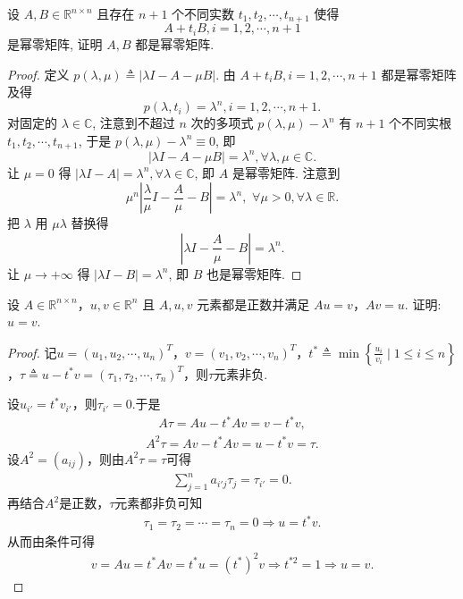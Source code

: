 \documentclass[../../main.tex]{subfiles}%
\begin{document}
\begin{example}
设 \( A,B \in \mathbb{R}^{n \times n} \) 且存在 \( n+1 \) 个不同实数 \( t_1,t_2,\cdots,t_{n+1} \) 使得
\[
A + t_i B, i = 1,2,\cdots,n+1
\]
是幂零矩阵, 证明 \( A,B \) 都是幂零矩阵.
\end{example}
\begin{proof}
定义 \( p(\lambda,\mu) \triangleq |\lambda I - A - \mu B| \). 由 \( A + t_i B, i = 1,2,\cdots,n+1 \) 都是幂零矩阵及得
\[
p(\lambda,t_i) = \lambda^n, i = 1,2,\cdots,n+1.
\]
对固定的 \( \lambda \in \mathbb{C} \), 注意到不超过 \( n \) 次的多项式 \( p(\lambda,\mu)-\lambda^n \) 有 \( n+1 \) 个不同实根 \( t_1,t_2,\cdots,t_{n+1} \), 于是 \( p(\lambda,\mu)-\lambda^n \equiv 0 \), 即
\[
|\lambda I - A - \mu B| = \lambda^n, \forall \lambda, \mu \in \mathbb{C}.
\]
让 \( \mu = 0 \) 得 \( |\lambda I - A| = \lambda^n, \forall \lambda \in \mathbb{C} \), 即 \( A \) 是幂零矩阵. 注意到
\[
\mu^n \left| \frac{\lambda}{\mu} I - \frac{A}{\mu} - B \right| = \lambda^n,\,\, \forall \mu >0,\forall \lambda \in \mathbb{R}.
\]
把 \( \lambda \) 用 \( \mu\lambda \) 替换得
\[
\left| \lambda I - \frac{A}{\mu} - B \right| = \lambda^n.
\]
让 \( \mu \to +\infty \) 得 \( |\lambda I - B| = \lambda^n \), 即 \( B \) 也是幂零矩阵.
\end{proof}

\begin{example}
设 \( A \in \mathbb{R}^{n \times n} \)，\( u, v \in \mathbb{R}^n \) 且 \( A, u, v \) 元素都是正数并满足 \( Au = v \)，\( Av = u \). 证明: \( u = v \).
\end{example}
\begin{proof}
记$u=(u_1,u_2,\cdots,u_n)^T$，$v=(v_1,v_2,\cdots,v_n)^T$，$t^*\triangleq\min\left\{\frac{u_i}{v_i}\mid 1\leqslant i\leqslant n\right\}$，$\tau\triangleq u-t^*v=(\tau_1,\tau_2,\cdots,\tau_n)^T$，则$\tau$元素非负.

设$u_{i'}=t^*v_{i'}$，则$\tau_{i'}=0$.于是
\begin{align*}
A\tau=Au-t^*Av=v-t^*v,
\end{align*}
\begin{align*}
A^2\tau=Av-t^*Av=u-t^*v=\tau.
\end{align*}
设$A^2=(a_{ij})$，则由$A^2\tau=\tau$可得
\begin{align*}
\sum_{j=1}^n a_{i'j}\tau_j=\tau_{i'}=0.
\end{align*}
再结合$A^2$是正数，$\tau$元素都非负可知
\begin{align*}
\tau_1=\tau_2=\cdots=\tau_n=0\Longrightarrow u=t^*v.
\end{align*}
从而由条件可得
\begin{align*}
v=Au=t^*Av=t^*u=(t^*)^2v\Longrightarrow t^{*2}=1\Longrightarrow u=v.
\end{align*}
\end{proof}
\end{document}
